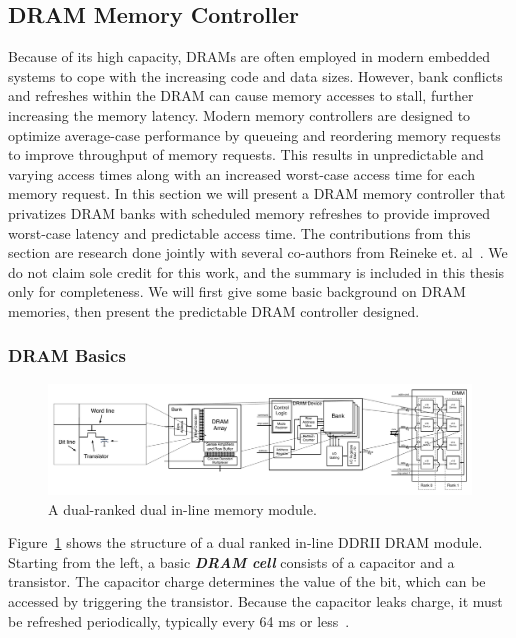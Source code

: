 \subsection{DRAM Memory Controller}
Because of its high capacity, DRAMs are often employed in modern embedded systems to cope with the increasing code and data sizes.  
However, bank conflicts and refreshes within the DRAM can cause memory accesses to stall, further increasing the memory latency. 
Modern memory controllers are designed to optimize average-case performance by queueing and reordering memory requests to improve throughput of memory requests. 
This results in unpredictable and varying access times along with an increased worst-case access time for each memory request.
In this section we will present a DRAM memory controller that privatizes DRAM banks with scheduled memory refreshes to provide improved worst-case latency and predictable access time.    
The contributions from this section are research done jointly with several co-authors from Reineke et. al~\cite{ReinekeLiuPatelKimLee11_PRETDRAMControllerBankPrivatizationForPredictability}. 
We do not claim sole credit for this work, and the summary is included in this thesis only for completeness. 
We will first give some basic background on DRAM memories, then present the predictable DRAM controller designed.

\subsubsection{DRAM Basics}

\begin{figure}[h]
\begin{center}
\vspace{-8mm}
\includegraphics[width=\textwidth]{figs/dram-overview.pdf}
\vspace{-8mm}
\caption{A dual-ranked dual in-line memory module.}\label{fig:dram_basics}
\vspace{-5mm}
\end{center}
\end{figure} 

Figure~\ref{fig:dram_basics} shows the structure of a dual ranked in-line DDRII DRAM module.
Starting from the left, a basic \textbf{\emph{DRAM cell}} consists of a capacitor and a transistor. 
The capacitor charge determines the value of the bit, which can be accessed by triggering the transistor. 
Because the capacitor leaks charge, it must be refreshed periodically, typically every 64 ms or less~\cite{jedec}.

